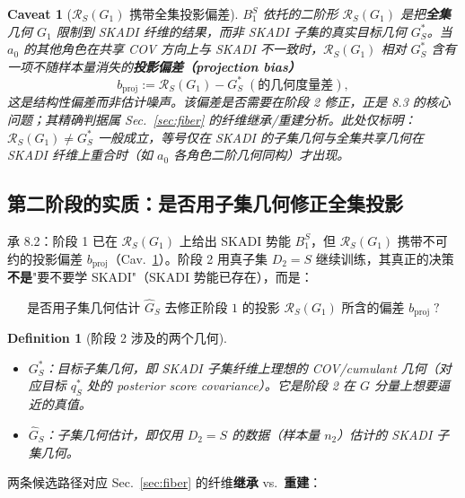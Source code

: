 \documentclass[11pt,a4paper]{article}
\newtheorem{definition}[theorem]{Definition}
\newtheorem{caveat}[theorem]{Caveat}
\newcommand{\Rstr}{\mathcal{R}}     %
\begin{document}
\begin{caveat}[$\Rstr_S(G_1)$ 携带全集投影偏差]\label{s8:cav-projbias}
$B_1^S$ 依托的二阶形 $\Rstr_S(G_1)$ 是把\textbf{全集}几何 $G_1$ 限制到 SKADI 纤维的结果，而非 SKADI 子集的真实目标几何 $G_S^*$。当 $a_0$ 的其他角色在共享 COV 方向上与 SKADI 不一致时，$\Rstr_S(G_1)$ 相对 $G_S^*$ 含有一项不随样本量消失的\textbf{投影偏差（projection bias）}
\[
b_{\mathrm{proj}}:=\Rstr_S(G_1)-G_S^*\;(\text{的几何度量差}),
\]
这是结构性偏差而非估计噪声。该偏差是否需要在阶段 2 修正，正是 8.3 的核心问题；其精确判据属 Sec.~\ref{sec:fiber} 的纤维继承/重建分析。此处仅标明：$\Rstr_S(G_1)\neq G_S^*$ 一般成立，等号仅在 SKADI 的子集几何与全集共享几何在 SKADI 纤维上重合时（如 $a_0$ 各角色二阶几何同构）才出现。
\end{caveat}

\subsection{第二阶段的实质：是否用子集几何修正全集投影}\label{s8:stage2}

承 8.2：阶段 1 已在 $\Rstr_S(G_1)$ 上给出 SKADI 势能 $B_1^S$，但 $\Rstr_S(G_1)$ 携带不可约的投影偏差 $b_{\mathrm{proj}}$（Cav.~\ref{s8:cav-projbias}）。阶段 2 用真子集 $D_2=S$ 继续训练，其真正的决策\textbf{不是}"要不要学 SKADI"（SKADI 势能已存在），而是：

\begin{equation}\label{s8:eq:decision}
\boxed{
\text{是否用子集几何估计 }\widehat G_S\text{ 去修正阶段 1 的投影 }\Rstr_S(G_1)\text{ 所含的偏差 }b_{\mathrm{proj}}\;?
}
\end{equation}

\begin{definition}[阶段 2 涉及的两个几何]\label{s8:def-geoms}
\begin{itemize}
\item $G_S^*$：\emph{目标子集几何}，即 SKADI 子集纤维上理想的 COV/cumulant 几何（对应目标 $q_S^*$ 处的 posterior score covariance）。它是阶段 2 在 $G$ 分量上想要逼近的真值。
\item $\widehat G_S$：\emph{子集几何估计}，即仅用 $D_2=S$ 的数据（样本量 $n_2$）估计的 SKADI 子集几何。
\end{itemize}
\end{definition}

两条候选路径对应 Sec.~\ref{sec:fiber} 的纤维\textbf{继承} vs.\ \textbf{重建}：
\end{document}
